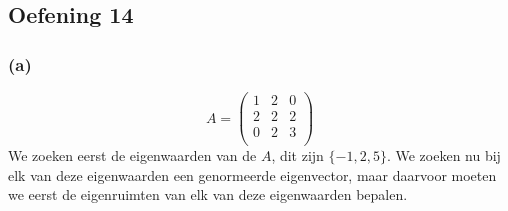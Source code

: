 \documentclass[lineaire_algebra_oplossingen.tex]{subfiles}
\begin{document}
\subsection{Oefening 14}
\subsubsection*{(a)}
\[
A = 
\begin{pmatrix}
1 & 2 & 0\\
2 & 2 & 2\\
0 & 2 & 3\\
\end{pmatrix}
\]
We zoeken eerst de eigenwaarden van de $A$, dit zijn $\{-1,2,5\}$.
We zoeken nu bij elk van deze eigenwaarden een genormeerde eigenvector, maar daarvoor moeten we eerst de eigenruimten van elk van deze eigenwaarden bepalen.
\end{document}
